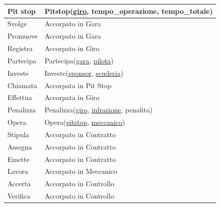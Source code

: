 \documentclass[11pt]{article}
\begin{document}
\begin{center}
{\begin{tabular}{ |l|l| }
            \hline
            Pit stop & Pitstop(\underline{giro}, tempo\_operazione, tempo\_totale) \\
            \hline
            Svolge & Accorpato in Gara \\
            \hline
            Promuove & Accorpato in Gara \\
            \hline
            Registra & Accorpato in Giro \\
            \hline
            Partecipa & Partecipa(\underline{gara}, \underline{pilota}) \\
            \hline
            Investe & Investe(\underline{sponsor}, \underline{scuderia}) \\
            \hline
            Chiamata & Accorpata in Pit Stop \\
            \hline
            Effettua & Accorpata in Giro \\
            \hline
            Penalizza & Penalizza(\underline{giro}, \underline{infrazione}, penalita) \\
            \hline
            Opera & Opera(\underline{pitstop}, \underline{meccanico}) \\
            \hline
            Stipula & Accorpato in Contratto \\
            \hline
            Assegna & Accorpato in Contratto \\
            \hline
            Emette & Accorpato in Contratto \\
            \hline
            Lavora & Accorpato in Meccanico \\
            \hline
            Accerta & Accorpato in Controllo \\
            \hline
            Verifica & Accorpato in Controllo \\
            \hline
        \end{tabular}
    }
\end{center}
\end{document}
